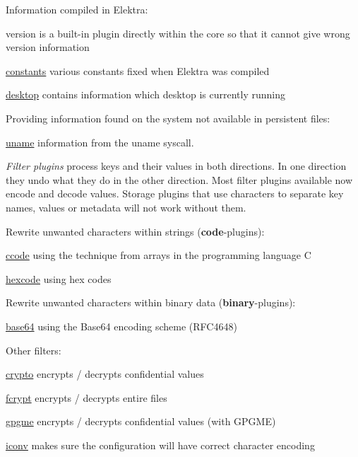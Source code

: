 Information compiled in Elektra\+:


\begin{DoxyItemize}
\item version is a built-\/in plugin directly within the core so that it cannot give wrong version information
\item \hyperlink{autotoc_md102_src_plugins_constants_README_md}{constants} various constants fixed when Elektra was compiled
\item \hyperlink{autotoc_md167_src_plugins_desktop_README_md}{desktop} contains information which desktop is currently running
\end{DoxyItemize}

Providing information found on the system not available in persistent files\+:


\begin{DoxyItemize}
\item \hyperlink{autotoc_md752_src_plugins_uname_README_md}{uname} information from the uname syscall.
\end{DoxyItemize}

{\itshape Filter plugins} process keys and their values in both directions. In one direction they undo what they do in the other direction. Most filter plugins available now encode and decode values. Storage plugins that use characters to separate key names, values or metadata will not work without them.

Rewrite unwanted characters within strings ({\bfseries code}-\/plugins)\+:


\begin{DoxyItemize}
\item \hyperlink{autotoc_md79_src_plugins_ccode_README_md}{ccode} using the technique from arrays in the programming language C
\item \hyperlink{autotoc_md253_src_plugins_hexcode_README_md}{hexcode} using hex codes
\end{DoxyItemize}

Rewrite unwanted characters within binary data ({\bfseries binary}-\/plugins)\+:


\begin{DoxyItemize}
\item \hyperlink{autotoc_md51_src_plugins_base64_README_md}{base64} using the Base64 encoding scheme (R\+F\+C4648)
\end{DoxyItemize}

Other filters\+:


\begin{DoxyItemize}
\item \hyperlink{autotoc_md109_src_plugins_crypto_README_md}{crypto} encrypts / decrypts confidential values
\item \hyperlink{autotoc_md200_src_plugins_fcrypt_README_md}{fcrypt} encrypts / decrypts entire files
\item \hyperlink{autotoc_md244_src_plugins_gpgme_README_md}{gpgme} encrypts / decrypts confidential values (with G\+P\+G\+ME)
\item \hyperlink{autotoc_md279_src_plugins_iconv_README_md}{iconv} makes sure the configuration will have correct character encoding
\end{DoxyItemize}

